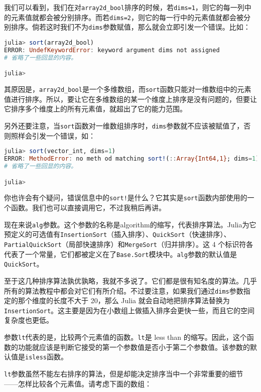 我们可以看到，我们在对\verb|array2d_bool|排序的时候，若\verb|dims=1|，则它的每一列中的元素值就都会被分别排序。而若\verb|dims=2|，则它的每一行中的元素值就都会被分别排序。倘若这时我们不为\verb|dims|参数赋值，那么就会立即引发一个错误。比如：

\begin{lstlisting}[language=julia]
julia> sort(array2d_bool)
ERROR: UndefKeywordError: keyword argument dims not assigned
# 省略了一些回显的内容。

julia> 
\end{lstlisting}

其原因是，\verb|array2d_bool|是一个多维数组，而\verb|sort|函数只能对一维数组中的元素值进行排序。所以，要让它在多维数组的某一个维度上排序是没有问题的，但要让它排序多个维度上的所有元素值，就超出了它的能力范围。

另外还要注意，当\verb|sort|函数对一维数组排序时，\verb|dims|参数就不应该被赋值了，否则照样会引发一个错误，如：

\begin{lstlisting}[language=julia]
julia> sort(vector_int, dims=1)
ERROR: MethodError: no meth od matching sort!(::Array{Int64,1}; dims=1)
# 省略了一些回显的内容。

julia> 
\end{lstlisting}

你也许会有个疑问，错误信息中的\verb|sort!|是什么？它其实是\verb|sort|函数内部使用的一个函数。我们也可以直接调用它，不过我稍后再讲。

现在来说\verb|alg|参数。这个参数的名称是algorithm的缩写，代表排序算法。Julia为它预定义的可选值有\verb|InsertionSort|（插入排序）、\verb|QuickSort|（快速排序）、\verb|PartialQuickSort|（局部快速排序）和\verb|MergeSort|（归并排序）。这 4 个标识符各代表了一个常量，它们都被定义在了\verb|Base.Sort|模块中。\verb|alg|参数的默认值是\verb|QuickSort|。

至于这几种排序算法孰优孰略，我就不多说了。它们都是很有知名度的算法。几乎所有的算法教程中都会对它们有所介绍。不过要注意，如果我们通过\verb|dims|参数指定的那个维度的长度不大于 20，那么 Julia 就会自动地把排序算法替换为\verb|InsertionSort|。这主要是因为在小数组上做插入排序会更快一些，而且它的空间复杂度也更低。

参数\verb|lt|代表的是，比较两个元素值的函数。\verb|lt|是 less than 的缩写。因此，这个函数的功能就应该是判断它接受的第一个参数值是否小于第二个参数值。该参数的默认值是\verb|isless|函数。

\verb|lt|参数虽然不能左右排序的算法，但是却能决定排序当中一个非常重要的细节——怎样比较各个元素值。请考虑下面的数组：

